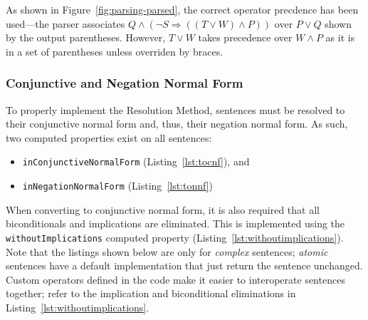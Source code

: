 As shown in Figure~\ref{fig:parsing-parsed}, the correct operator precdence has
been used---the parser associates $Q \wedge (\neg S \Rightarrow ((T \vee W) \wedge P))$
over $P \vee Q$ shown by the output parentheses. However, $T \vee W$ takes
precedence over $W \wedge P$ as it is in a set of parentheses unless overriden by braces.

\subsubsection{Conjunctive and Negation Normal Form}
\label{subs:CNF}

To properly implement the Resolution Method, sentences must be resolved to their
conjunctive normal form and, thus, their negation normal form. As such, two
computed properties exist on all sentences:

\begin{itemize}
  \item \texttt{inConjunctiveNormalForm} (Listing~\ref{lst:tocnf}), and
  \item \texttt{inNegationNormalForm} (Listing~\ref{lst:tonnf})
\end{itemize}

When converting to conjunctive normal form, it is also required that all biconditionals
and implications are eliminated. This is implemented using the \texttt{withoutImplications}
computed property (Listing~\ref{lst:withoutimplications}). Note that the listings shown below
are only for \emph{complex} sentences; \textit{atomic} sentences have a default
implementation that just return the sentence unchanged. Custom operators defined
in the code make it easier to interoperate sentences together; refer to the implication
and biconditional eliminations in Listing~\ref{lst:withoutimplications}.






